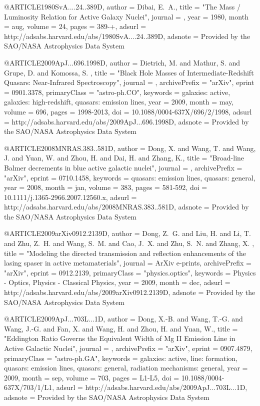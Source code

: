 \documentclass[twocolumn]{aastex62}
\begin{document}
@ARTICLE{1980SvA....24..389D,
   author = {{Dibai}, E.~A.},
    title = "{The Mass / Luminosity Relation for Active Galaxy Nuclei}",
  journal = {\sovast},
     year = 1980,
    month = aug,
   volume = 24,
    pages = {389-+},
   adsurl = {http://adsabs.harvard.edu/abs/1980SvA....24..389D},
  adsnote = {Provided by the SAO/NASA Astrophysics Data System}
}


@ARTICLE{2009ApJ...696.1998D,
   author = {{Dietrich}, M. and {Mathur}, S. and {Grupe}, D. and {Komossa}, S.
	},
    title = "{Black Hole Masses of Intermediate-Redshift Quasars: Near-Infrared Spectroscopy}",
  journal = {\apj},
archivePrefix = "arXiv",
   eprint = {0901.3378},
 primaryClass = "astro-ph.CO",
 keywords = {galaxies: active, galaxies: high-redshift, quasars: emission lines},
     year = 2009,
    month = may,
   volume = 696,
    pages = {1998-2013},
      doi = {10.1088/0004-637X/696/2/1998},
   adsurl = {http://adsabs.harvard.edu/abs/2009ApJ...696.1998D},
  adsnote = {Provided by the SAO/NASA Astrophysics Data System}
}


@ARTICLE{2008MNRAS.383..581D,
   author = {{Dong}, X. and {Wang}, T. and {Wang}, J. and {Yuan}, W. and 
	{Zhou}, H. and {Dai}, H. and {Zhang}, K.},
    title = "{Broad-line Balmer decrements in blue active galactic nuclei}",
  journal = {\mnras},
archivePrefix = "arXiv",
   eprint = {0710.1458},
 keywords = {quasars: emission lines, quasars: general},
     year = 2008,
    month = jan,
   volume = 383,
    pages = {581-592},
      doi = {10.1111/j.1365-2966.2007.12560.x},
   adsurl = {http://adsabs.harvard.edu/abs/2008MNRAS.383..581D},
  adsnote = {Provided by the SAO/NASA Astrophysics Data System}
}



@ARTICLE{2009arXiv0912.2139D,
   author = {{Dong}, Z.~G. and {Liu}, H. and {Li}, T. and {Zhu}, Z.~H. and 
	{Wang}, S.~M. and {Cao}, J.~X. and {Zhu}, S.~N. and {Zhang}, X.
	},
    title = "{Modeling the directed transmission and reflection enhancements of the lasing spaser in active metamaterials}",
  journal = {ArXiv e-prints},
archivePrefix = "arXiv",
   eprint = {0912.2139},
 primaryClass = "physics.optics",
 keywords = {Physics - Optics, Physics - Classical Physics},
     year = 2009,
    month = dec,
   adsurl = {http://adsabs.harvard.edu/abs/2009arXiv0912.2139D},
  adsnote = {Provided by the SAO/NASA Astrophysics Data System}
}


@ARTICLE{2009ApJ...703L...1D,
   author = {{Dong}, X.-B. and {Wang}, T.-G. and {Wang}, J.-G. and {Fan}, X. and 
	{Wang}, H. and {Zhou}, H. and {Yuan}, W.},
    title = "{Eddington Ratio Governs the Equivalent Width of Mg II Emission Line in Active Galactic Nuclei}",
  journal = {\apjl},
archivePrefix = "arXiv",
   eprint = {0907.4879},
 primaryClass = "astro-ph.GA",
 keywords = {galaxies: active, line: formation, quasars: emission lines, quasars: general, radiation mechanisms: general},
     year = 2009,
    month = sep,
   volume = 703,
    pages = {L1-L5},
      doi = {10.1088/0004-637X/703/1/L1},
   adsurl = {http://adsabs.harvard.edu/abs/2009ApJ...703L...1D},
  adsnote = {Provided by the SAO/NASA Astrophysics Data System}
}
\end{document}
